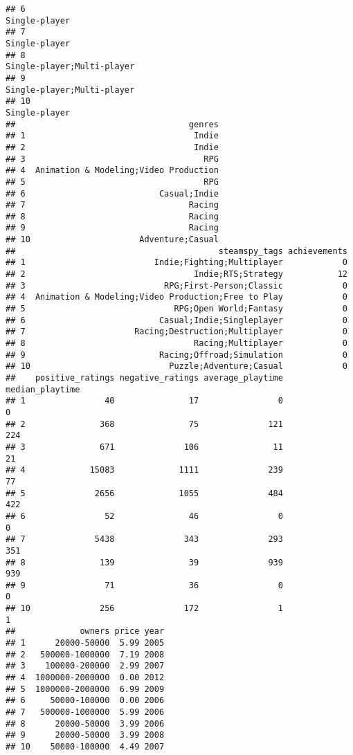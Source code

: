 \documentclass[
]{article}
\begin{document}
\begin{verbatim}
## 6                                                                                                                          Single-player
## 7                                                                                                                          Single-player
## 8                                                                                                             Single-player;Multi-player
## 9                                                                                                             Single-player;Multi-player
## 10                                                                                                                         Single-player
##                                   genres
## 1                                  Indie
## 2                                  Indie
## 3                                    RPG
## 4  Animation & Modeling;Video Production
## 5                                    RPG
## 6                           Casual;Indie
## 7                                 Racing
## 8                                 Racing
## 9                                 Racing
## 10                      Adventure;Casual
##                                         steamspy_tags achievements
## 1                          Indie;Fighting;Multiplayer            0
## 2                                  Indie;RTS;Strategy           12
## 3                            RPG;First-Person;Classic            0
## 4  Animation & Modeling;Video Production;Free to Play            0
## 5                              RPG;Open World;Fantasy            0
## 6                           Casual;Indie;Singleplayer            0
## 7                      Racing;Destruction;Multiplayer            0
## 8                                  Racing;Multiplayer            0
## 9                           Racing;Offroad;Simulation            0
## 10                            Puzzle;Adventure;Casual            0
##    positive_ratings negative_ratings average_playtime median_playtime
## 1                40               17                0               0
## 2               368               75              121             224
## 3               671              106               11              21
## 4             15083             1111              239              77
## 5              2656             1055              484             422
## 6                52               46                0               0
## 7              5438              343              293             351
## 8               139               39              939             939
## 9                71               36                0               0
## 10              256              172                1               1
##             owners price year
## 1      20000-50000  5.99 2005
## 2   500000-1000000  7.19 2008
## 3    100000-200000  2.99 2007
## 4  1000000-2000000  0.00 2012
## 5  1000000-2000000  6.99 2009
## 6     50000-100000  0.00 2006
## 7   500000-1000000  5.99 2006
## 8      20000-50000  3.99 2006
## 9      20000-50000  3.99 2008
## 10    50000-100000  4.49 2007
\end{verbatim}
\end{document}
